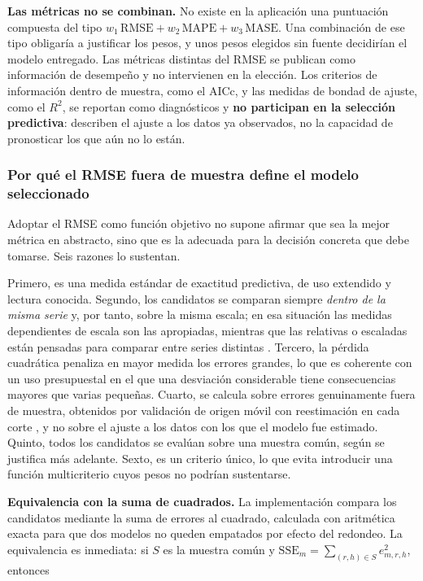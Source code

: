 \documentclass[12pt,letterpaper]{article}
\providecommand{\parencite}{\citep}
\begin{document}
\textbf{Las métricas no se combinan.} No existe en la aplicación una puntuación compuesta del tipo \(w_1\,\mathrm{RMSE}+w_2\,\mathrm{MAPE}+w_3\,\mathrm{MASE}\). Una combinación de ese tipo obligaría a justificar los pesos, y unos pesos elegidos sin fuente decidirían el modelo entregado. Las métricas distintas del RMSE se publican como información de desempeño y no intervienen en la elección. Los criterios de información dentro de muestra, como el AICc, y las medidas de bondad de ajuste, como el \(R^2\), se reportan como diagnósticos y \textbf{no participan en la selección predictiva}: describen el ajuste a los datos ya observados, no la capacidad de pronosticar los que aún no lo están.

\subsubsection*{Por qué el RMSE fuera de muestra define el modelo seleccionado}

Adoptar el RMSE como función objetivo no supone afirmar que sea la mejor métrica en abstracto, sino que es la adecuada para la decisión concreta que debe tomarse. Seis razones lo sustentan.

Primero, es una medida estándar de exactitud predictiva, de uso extendido y lectura conocida. Segundo, los candidatos se comparan siempre \emph{dentro de la misma serie} y, por tanto, sobre la misma escala; en esa situación las medidas dependientes de escala son las apropiadas, mientras que las relativas o escaladas están pensadas para comparar entre series distintas \parencite{hyndman_koehler2006,hyndman2021fpp3}. Tercero, la pérdida cuadrática penaliza en mayor medida los errores grandes, lo que es coherente con un uso presupuestal en el que una desviación considerable tiene consecuencias mayores que varias pequeñas. Cuarto, se calcula sobre errores genuinamente fuera de muestra, obtenidos por validación de origen móvil con reestimación en cada corte \parencite{tashman2000,hyndman2021fpp3}, y no sobre el ajuste a los datos con los que el modelo fue estimado. Quinto, todos los candidatos se evalúan sobre una muestra común, según se justifica más adelante. Sexto, es un criterio único, lo que evita introducir una función multicriterio cuyos pesos no podrían sustentarse.

\textbf{Equivalencia con la suma de cuadrados.} La implementación compara los candidatos mediante la suma de errores al cuadrado, calculada con aritmética exacta para que dos modelos no queden empatados por efecto del redondeo. La equivalencia es inmediata: si \(S\) es la muestra común y \(\mathrm{SSE}_m=\sum_{(r,h)\in S}e_{m,r,h}^{2}\), entonces
\end{document}
